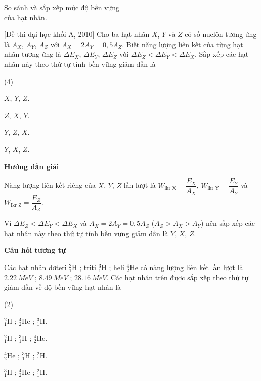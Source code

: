 \begin{dang}{So sánh và sắp xếp mức độ bền vững\\ của hạt nhân.}
	
	
	
	
	{[Đề thi đại học khối A, 2010] Cho ba hạt nhân $X$, $Y$ và $Z$ có số nuclôn tương ứng là $A_X$, $A_Y$, $A_Z$ với $A_X = 2A_Y = 0,5A_Z$. Biết năng lượng liên kết của từng hạt nhân tương ứng là $\Delta E_X$, $\Delta E_Y$, $\Delta E_Z$ với $\Delta E_Z < \Delta E_Y < \Delta E_X$. Sắp xếp các hạt nhân này theo thứ tự tính bền vững giảm dần là
		\begin{mcq}(4)
			\item $X$, $Y$, $Z$.
			\item $Z$, $X$, $Y$. 
			\item $Y$, $Z$, $X$.
			\item $Y$, $X$, $Z$.
		\end{mcq}
	}{\begin{center}
			\textbf{Hướng dẫn giải}
		\end{center}
		
		Năng lượng liên kết riêng của $X$, $Y$, $Z$ lần lượt là $W_\textrm{lkr X}=\dfrac{E_X}{A_X}$, $W_\textrm{lkr Y}=\dfrac{E_Y}{A_Y}$ và $W_\textrm{lkr Z}=\dfrac{E_Z}{A_Z}$.
		
		Vì $\Delta E_Z < \Delta E_Y < \Delta E_X$ và $A_X = 2A_Y = 0,5A_Z$ ($A_Z>A_X>A_Y$) nên sắp xếp các hạt nhân này theo thứ tự tính bền vững giảm dần là $Y$, $X$, $Z$.
		
		\begin{center}
			\textbf{Câu hỏi tương tự}
		\end{center}
		Các hạt nhân đơteri $ ^{2}_{1} \text{H} $ ; triti $ ^{3}_{1} \text{H} $ ; heli $ ^{4}_{2} \text{He} $ có năng lượng liên kết lần lượt là $ \SI{2,22}{MeV} $ ; $ \SI{8,49}{MeV} $ ; $ \SI{28,16}{MeV} $. Các hạt nhân trên được sắp xếp theo thứ tự giảm dần về độ bền vững hạt nhân là
		\begin{mcq}(2)
			\item $ ^{2}_{1} \text{H} $ ; $ ^{4}_{2} \text{He} $ ; $ ^{3}_{1} \text{H} $.
			\item $ ^{2}_{1} \text{H} $ ; $ ^{3}_{1} \text{H} $ ; $ ^{4}_{2} \text{He} $.
			\item $ ^{4}_{2} \text{He} $ ; $ ^{3}_{1} \text{H} $ ; $ ^{2}_{1} \text{H} $.
			\item $ ^{3}_{1} \text{H} $ ; $ ^{4}_{2} \text{He} $ ; $ ^{2}_{1} \text{H} $.
		\end{mcq}
		
}
\end{dang}
